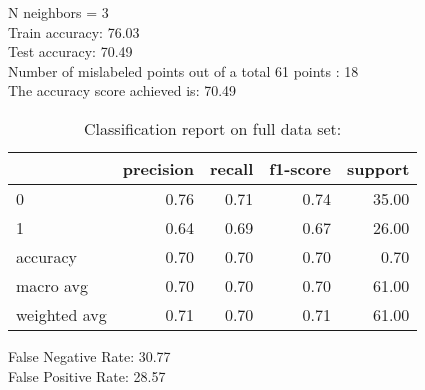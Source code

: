 N neighbors = 3\\
Train accuracy: 76.03%
\\Test accuracy: 70.49%
\\Number of mislabeled points out of a total 61 points : 18
\\The accuracy score achieved is: 70.49 %
\begin{table}[H]
\caption{Classification report on full data set:}
\begin{center}
\begin{tabular}{lrrrr}
\toprule
{} &  precision &  recall &  f1-score &  support \\
\midrule
0            &       0.76 &    0.71 &      0.74 &    35.00 \\
1            &       0.64 &    0.69 &      0.67 &    26.00 \\
accuracy     &       0.70 &    0.70 &      0.70 &     0.70 \\
macro avg    &       0.70 &    0.70 &      0.70 &    61.00 \\
weighted avg &       0.71 &    0.70 &      0.71 &    61.00 \\
\bottomrule
\end{tabular}

\label{k_nearest_neighbors_class}
\end{center}
\end{table}
\noindent
False Negative Rate: 30.77
\\False Positive Rate: 28.57
